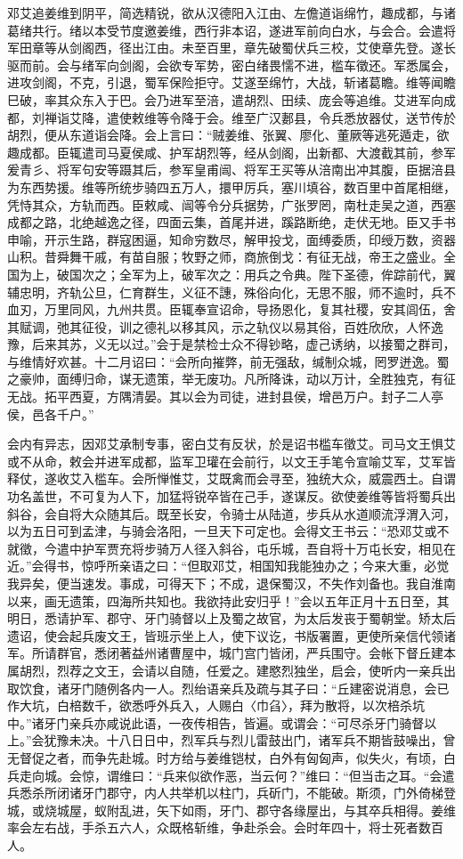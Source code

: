\documentclass[12pt,UTF8]{ctexbook}
\begin{document}
邓艾追姜维到阴平，简选精锐，欲从汉德阳入江由、左儋道诣绵竹，趣成都，与诸葛绪共行。绪以本受节度邀姜维，西行非本诏，遂进军前向白水，与会合。会遣将军田章等从剑阁西，径出江由。未至百里，章先破蜀伏兵三校，艾使章先登。遂长驱而前。会与绪军向剑阁，会欲专军势，密白绪畏懦不进，槛车徵还。军悉属会，进攻剑阁，不克，引退，蜀军保险拒守。艾遂至绵竹，大战，斩诸葛瞻。维等闻瞻巳破，率其众东入于巴。会乃进军至涪，遣胡烈、田续、庞会等追维。艾进军向成都，刘禅诣艾降，遣使敕维等令降于会。维至广汉郪县，令兵悉放器仗，送节传於胡烈，便从东道诣会降。会上言曰：“贼姜维、张翼、廖化、董厥等逃死遁走，欲趣成都。臣辄遣司马夏侯咸、护军胡烈等，经从剑阁，出新都、大渡截其前，参军爰青彡、将军句安等蹑其后，参军皇甫闿、将军王买等从涪南出冲其腹，臣据涪县为东西势援。维等所统步骑四五万人，擐甲厉兵，塞川填谷，数百里中首尾相继，凭恃其众，方轨而西。臣敕咸、闿等令分兵据势，广张罗罔，南杜走吴之道，西塞成都之路，北绝越逸之径，四面云集，首尾并进，蹊路断绝，走伏无地。臣又手书申喻，开示生路，群寇困逼，知命穷数尽，解甲投戈，面缚委质，印绶万数，资器山积。昔舜舞干戚，有苗自服；牧野之师，商旅倒戈：有征无战，帝王之盛业。全国为上，破国次之；全军为上，破军次之：用兵之令典。陛下圣德，侔踪前代，翼辅忠明，齐轨公旦，仁育群生，义征不譓，殊俗向化，无思不服，师不逾时，兵不血刃，万里同风，九州共贯。臣辄奉宣诏命，导扬恩化，复其社稷，安其闾伍，舍其赋调，弛其征役，训之德礼以移其风，示之轨仪以易其俗，百姓欣欣，人怀逸豫，后来其苏，义无以过。”会于是禁检士众不得钞略，虚己诱纳，以接蜀之群司，与维情好欢甚。十二月诏曰：“会所向摧弊，前无强敌，缄制众城，罔罗迸逸。蜀之豪帅，面缚归命，谋无遗策，举无废功。凡所降诛，动以万计，全胜独克，有征无战。拓平西夏，方隅清晏。其以会为司徒，进封县侯，增邑万户。封子二人亭侯，邑各千户。”

会内有异志，因邓艾承制专事，密白艾有反状，於是诏书槛车徵艾。司马文王惧艾或不从命，敕会并进军成都，监军卫瓘在会前行，以文王手笔令宣喻艾军，艾军皆释仗，遂收艾入槛车。会所惮惟艾，艾既禽而会寻至，独统大众，威震西土。自谓功名盖世，不可复为人下，加猛将锐卒皆在己手，遂谋反。欲使姜维等皆将蜀兵出斜谷，会自将大众随其后。既至长安，令骑士从陆道，步兵从水道顺流浮渭入河，以为五日可到孟津，与骑会洛阳，一旦天下可定也。会得文王书云：“恐邓艾或不就徵，今遣中护军贾充将步骑万人径入斜谷，屯乐城，吾自将十万屯长安，相见在近。”会得书，惊呼所亲语之曰：“但取邓艾，相国知我能独办之；今来大重，必觉我异矣，便当速发。事成，可得天下；不成，退保蜀汉，不失作刘备也。我自淮南以来，画无遗策，四海所共知也。我欲持此安归乎！”会以五年正月十五日至，其明日，悉请护军、郡守、牙门骑督以上及蜀之故官，为太后发丧于蜀朝堂。矫太后遗诏，使会起兵废文王，皆班示坐上人，使下议讫，书版署置，更使所亲信代领诸军。所请群官，悉闭著益州诸曹屋中，城门宫门皆闭，严兵围守。会帐下督丘建本属胡烈，烈荐之文王，会请以自随，任爱之。建愍烈独坐，启会，使听内一亲兵出取饮食，诸牙门随例各内一人。烈绐语亲兵及疏与其子曰：“丘建密说消息，会已作大坑，白棓数千，欲悉呼外兵入，人赐白〈巾臽〉，拜为散将，以次棓杀坑中。”诸牙门亲兵亦咸说此语，一夜传相告，皆遍。或谓会：“可尽杀牙门骑督以上。”会犹豫未决。十八日日中，烈军兵与烈儿雷鼓出门，诸军兵不期皆鼓噪出，曾无督促之者，而争先赴城。时方给与姜维铠杖，白外有匈匈声，似失火，有顷，白兵走向城。会惊，谓维曰：“兵来似欲作恶，当云何？”维曰：“但当击之耳。“会遣兵悉杀所闭诸牙门郡守，内人共举机以柱门，兵斫门，不能破。斯须，门外倚梯登城，或烧城屋，蚁附乱进，矢下如雨，牙门、郡守各缘屋出，与其卒兵相得。姜维率会左右战，手杀五六人，众既格斩维，争赴杀会。会时年四十，将士死者数百人。
\end{document}
